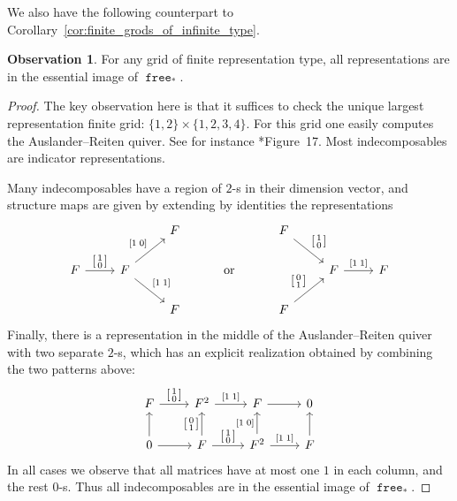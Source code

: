 \documentclass[a4paper]{amsart}
\theoremstyle{plain}
\theoremstyle{definition}
\newtheorem{observation}[theorem]{Observation}
\theoremstyle{remark}
\newcommand{\funct}[1]{\operatorname{\mathtt{#1}}}
\begin{document}
We also have the following counterpart to Corollary~\ref{cor:finite_grods_of_infinite_type}.

\begin{observation} \label{obs:repfinite_grids}
For any grid of finite representation type, all representations are in the essential image of \( \funct{free}_* \).
\end{observation}

\begin{proof}
The key observation here is that it suffices to check the unique largest representation finite grid: \( \{1,2\} \times \{1,2,3,4\} \). For this grid one easily computes the Auslander--Reiten quiver. See for instance \cite{EscolarHiraoka}*{Figure~17}. Most indecomposables are indicator representations.

Many indecomposables have a region of \( 2 \)-s in their dimension vector, and structure maps are given by extending by identities the representations
\[ \begin{tikzcd}
  && F && F \ar[rd,"{\left[ \begin{smallmatrix} 1 \\ 0 \end{smallmatrix} \right]}"] && \\
  F \ar[r,"{\left[ \begin{smallmatrix} 1 \\ 0 \end{smallmatrix} \right]}"] & F \ar[ru,"{[1 \; 0]}"] \ar[rd,"{[1 \; 1]}"] && \text{ or } && F \ar[r,"{[1 \; 1]}"] & F \\
  && F && F \ar[ru,"{\left[ \begin{smallmatrix} 0 \\ 1 \end{smallmatrix} \right]}"] &&
\end{tikzcd} \]
Finally, there is a representation in the middle of the Auslander--Reiten quiver with two separate \( 2 \)-s, which has an explicit realization obtained by combining the two patterns above:
\[ \begin{tikzcd}
F \ar[r, "{\left[ \begin{smallmatrix} 1 \\ 0 \end{smallmatrix} \right]}"] & F^2 \ar[r,"{[1 \; 1]}"] & F \ar[r] & 0 \\
0 \ar[r] \ar[u] & F \ar[u, "{\left[ \begin{smallmatrix} 0 \\ 1 \end{smallmatrix} \right]}"] \ar[r, "{\left[ \begin{smallmatrix} 1 \\ 0 \end{smallmatrix} \right]}"] & F^2 \ar[r,"{[1 \; 1]}"] \ar[u,"{[1 \; 0]}"] & F \ar[u]
\end{tikzcd} \]
In all cases we observe that all matrices have at most one \( 1 \) in each column, and the rest \(0 \)-s. Thus all indecomposables are in the essential image of \( \funct{free}_* \).
\end{proof}
\end{document}
